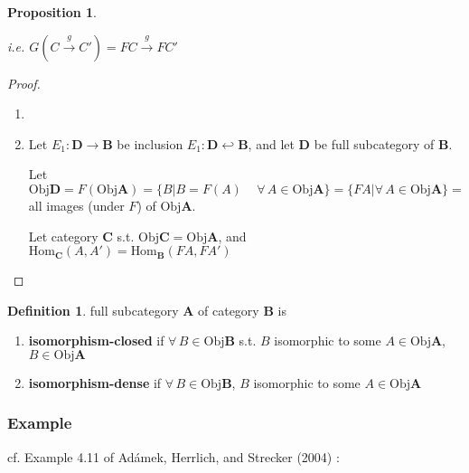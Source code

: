 \documentclass[twoside,landscape,10pt]{amsart}
\theoremstyle{plain}
\newtheorem{proposition}{Proposition}
\theoremstyle{definition}
\newtheorem{definition}{Definition}
\theoremstyle{remark}
\begin{document}
\begin{multicols*}{2}
\begin{proposition}
\begin{enumerate}
i.e. $G(C\xrightarrow{g}C') = FC \xrightarrow{g} FC'$



\end{enumerate}
\end{proposition}
\begin{proof}
\begin{enumerate}
\item
\item Let $E_1 : \mathbf{D} \to \mathbf{B}$ be inclusion $E_1: \mathbf{D} \hookleftarrow \mathbf{B}$, and let $\mathbf{D} $ be full subcategory of $\mathbf{B}$.  

Let $\text{Obj}\mathbf{D} = F(\text{Obj}\mathbf{A}) = \lbrace B | B = F(A) \quad \, \forall \, A \in \text{Obj}\mathbf{A} \rbrace = \lbrace FA | \forall \, A \in \text{Obj}\mathbf{A} \rbrace = $ all images (under $F$) of $\text{Obj}\mathbf{A}$.  

Let category $\mathbf{C}$ s.t. $\text{Obj}\mathbf{C} = \text{Obj}\mathbf{A}$, and \\
 $\text{Hom}_{\mathbf{C}}(A,A') = \text{Hom}_{\mathbf{B}}(FA,FA')$
\end{enumerate}
\end{proof}


\begin{definition}
  full subcategory $\mathbf{A}$ of category $\mathbf{B}$ is 
\begin{enumerate}
  \item \textbf{isomorphism-closed} if $\forall \, B \in \text{Obj}\mathbf{B}$ s.t. $B$ isomorphic to some $A \in \text{Obj}\mathbf{A}$, $B\in \text{Obj}\mathbf{A}$ 
  \item \textbf{isomorphism-dense} if $\forall \, B \in \text{Obj}\mathbf{B}$, $B$ isomorphic to some $A\in \text{Obj}\mathbf{A}$
\end{enumerate}
\end{definition}

\subsubsection{Example} cf. Example 4.11 of Ad\'{a}mek, Herrlich, and Strecker (2004) \cite{AHS2004}:


\end{multicols*}
\end{document}
